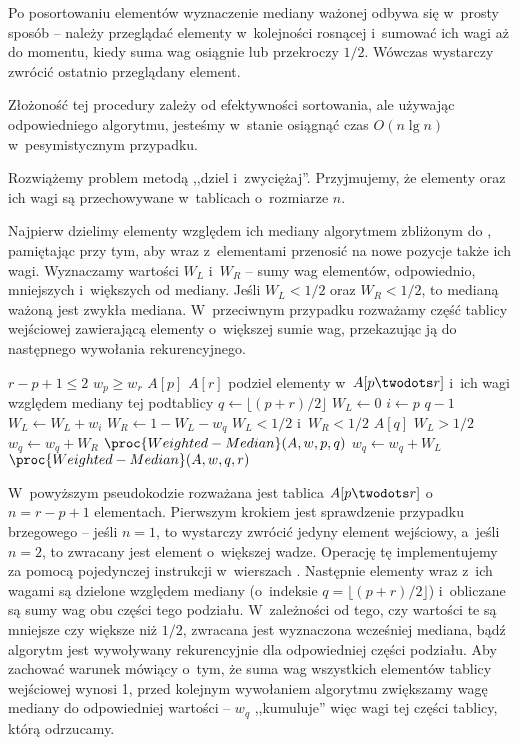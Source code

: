 \subproblem %
Po posortowaniu elementów wyznaczenie mediany ważonej odbywa się w~prosty sposób -- należy przeglądać elementy w~kolejności rosnącej i~sumować ich wagi aż do momentu, kiedy suma wag osiągnie lub przekroczy $1/2$. Wówczas wystarczy zwrócić ostatnio przeglądany element.

Złożoność tej procedury zależy od efektywności sortowania, ale używając odpowiedniego algorytmu, jesteśmy w~stanie osiągnąć czas $O(n\lg n)$ w~pesymistycznym przypadku.

\subproblem %
Rozwiążemy problem metodą ,,dziel i~zwyciężaj''. Przyjmujemy, że elementy oraz ich wagi są przechowywane w~tablicach o~rozmiarze $n$.

Najpierw dzielimy elementy względem ich mediany algorytmem zbliżonym do , pamiętając przy tym, aby wraz z~elementami przenosić na nowe pozycje także ich wagi. Wyznaczamy wartości $W_L$ i~$W_R$ -- sumy wag elementów, odpowiednio, mniejszych i~większych od mediany. Jeśli $W_L<1/2$ oraz $W_R<1/2$, to medianą ważoną jest zwykła mediana. W~przeciwnym przypadku rozważamy część tablicy wejściowej zawierającą elementy o~większej sumie wag, przekazując ją do następnego wywołania rekurencyjnego.

\begin{codebox}
\li	\If $r-p+1\le2$
\li		\Then
			\If $w_p\ge w_r$ \label{li:weighted-median-boundary-case-begin}
\li				\Then \Return $A[p]$
\li				\Else \Return $A[r]$
				\End \label{li:weighted-median-boundary-case-end}
		\End
\li	podziel elementy w~$A[p\twodots r]$ i~ich wagi względem mediany tej podtablicy \label{li:weighted-median-partition}
\li	$q\gets\lfloor(p+r)/2\rfloor$
\li	$W_L\gets0$
\li	\For $i\gets p$ \To $q-1$
\li		\Do $W_L\gets W_L+w_i$
		\End
\li	$W_R\gets1-W_L-w_q$
\li	\If $W_L<1/2$ i~$W_R<1/2$
\li		\Then \Return $A[q]$
		\End
\li	\If $W_L>1/2$
\li		\Then
			$w_q\gets w_q+W_R$
\li			\Return $\proc{Weighted-Median}(A,w,p,q)$
\li		\Else
			$w_q\gets w_q+W_L$
\li			\Return $\proc{Weighted-Median}(A,w,q,r)$
		\End
\end{codebox}

W~powyższym pseudokodzie rozważana jest tablica $A[p\twodots r]$ o~$n=r-p+1$ elementach. Pierwszym krokiem jest sprawdzenie przypadku brzegowego -- jeśli $n=1$, to wystarczy zwrócić jedyny element wejściowy, a~jeśli $n=2$, to zwracany jest element o~większej wadze. Operację tę implementujemy za pomocą pojedynczej instrukcji  w~wierszach \twodashes{\ref{li:weighted-median-boundary-case-begin}}{\ref{li:weighted-median-boundary-case-end}}. Następnie elementy wraz z~ich wagami są dzielone względem mediany (o~indeksie $q=\lfloor(p+r)/2\rfloor$) i~obliczane są sumy wag obu części tego podziału. W~zależności od tego, czy wartości te są mniejsze czy większe niż $1/2$, zwracana jest wyznaczona wcześniej mediana, bądź algorytm jest wywoływany rekurencyjnie dla odpowiedniej części podziału. Aby zachować warunek mówiący o~tym, że suma wag wszystkich elementów tablicy wejściowej wynosi 1, przed kolejnym wywołaniem algorytmu zwiększamy wagę mediany do odpowiedniej wartości -- $w_q$ ,,kumuluje'' więc wagi tej części tablicy, którą odrzucamy.

